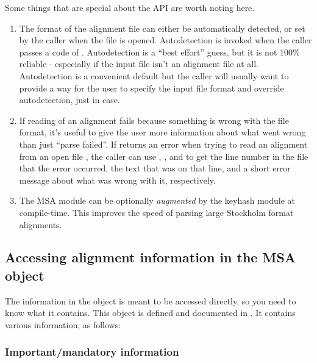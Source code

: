 Some things that are special about the API are worth noting here.

\begin{enumerate}
\item The format of the alignment file can either be automatically
      detected, or set by the caller when the file is opened.
      Autodetection is invoked when the caller passes a 
      code of . Autodetection is a ``best
      effort'' guess, but it is not 100\% reliable - especially if the
      input file isn't an alignment file at all. Autodetection is a
      convenient default but the caller will usually want to provide a
      way for the user to specify the input file format and override
      autodetection, just in case.

\item If reading of an alignment fails because something is wrong with
      the file format, it's useful to give the user more information
      about what went wrong than just ``parse failed''. If
       returns an  error
      when trying to read an alignment from an open file ,
      the caller can use , ,
      and  to get the line number in the file that
      the error occurred, the text that was on that line, and a short
      error message about what was wrong with it, respectively.

\item The MSA module can be optionally \emph{augmented} by the keyhash
      module at compile-time. This improves the speed of parsing large 
      Stockholm format alignments.
\end{enumerate}

\subsection{Accessing alignment information in the MSA object}

The information in the  object is meant to be accessed
directly, so you need to know what it contains. This object is defined
and documented in . It contains various information, as
follows:

\subsubsection{Important/mandatory information}

